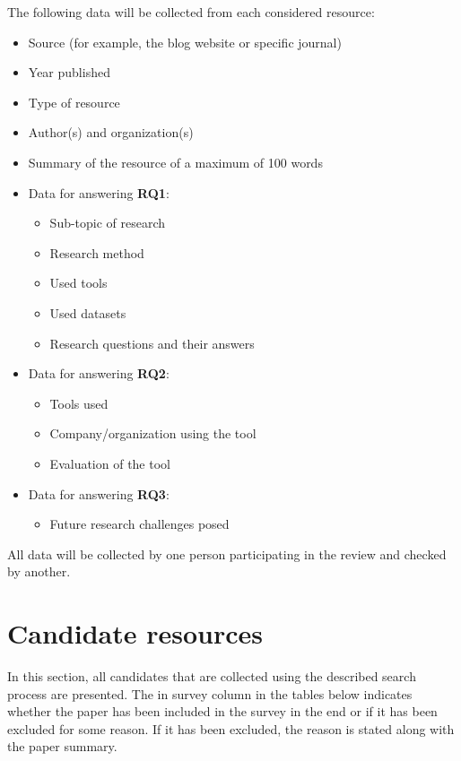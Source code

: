\documentclass[]{book}
\providecommand{\tightlist}{%
  \setlength{\itemsep}{0pt}\setlength{\parskip}{0pt}}
\begin{document}
The following data will be collected from each considered resource:

\begin{itemize}
\tightlist
\item
  Source (for example, the blog website or specific journal)
\item
  Year published
\item
  Type of resource
\item
  Author(s) and organization(s)
\item
  Summary of the resource of a maximum of 100 words
\item
  Data for answering \textbf{RQ1}:

  \begin{itemize}
  \tightlist
  \item
    Sub-topic of research
  \item
    Research method
  \item
    Used tools
  \item
    Used datasets
  \item
    Research questions and their answers
  \end{itemize}
\item
  Data for answering \textbf{RQ2}:

  \begin{itemize}
  \tightlist
  \item
    Tools used
  \item
    Company/organization using the tool
  \item
    Evaluation of the tool
  \end{itemize}
\item
  Data for answering \textbf{RQ3}:

  \begin{itemize}
  \tightlist
  \item
    Future research challenges posed
  \end{itemize}
\end{itemize}

All data will be collected by one person participating in the review and
checked by another.

\section{Candidate resources}\label{candidate-resources}

In this section, all candidates that are collected using the described
search process are presented. The in survey column in the tables below
indicates whether the paper has been included in the survey in the end
or if it has been excluded for some reason. If it has been excluded, the
reason is stated along with the paper summary.
\end{document}
